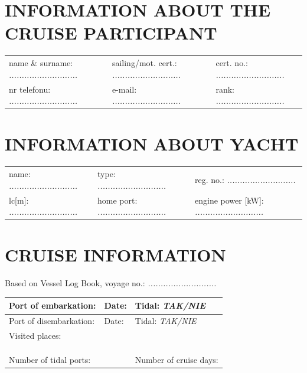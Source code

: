 \documentclass{article}
\begin{document}
\section*{INFORMATION ABOUT THE CRUISE PARTICIPANT}
\begin{tabularx}{\textwidth}{X X X}
name \& surname: \textit{...........................} & sailing/mot. cert.: \textit{...........................} & cert. no.: \textit{...........................} \\
nr telefonu: \textit{...........................} & e-mail: \textit{...........................} & rank: \textit{...........................} \\
\end{tabularx}

\section*{INFORMATION ABOUT YACHT}

\begin{tabularx}{\textwidth}{X X X}
name: \textit{...........................} & type: \textit{...........................} & reg. no.: \textit{...........................} \\
lc[m]: \textit{...........................} & home port: \textit{...........................} & engine power [kW]: \textit{...........................} \\
\end{tabularx}

\section*{CRUISE INFORMATION}

Based on Vessel Log Book, voyage no.: \textit{...........................}
\\

\begin{tabularx}{\textwidth}{|X|X|X|}
\hline
Port of embarkation: \textit{} & Date: \textit{} & Tidal: \textit{TAK/NIE} \\
\hline
Port of disembarkation: \textit{} & Date: \textit{} & Tidal: \textit{TAK/NIE} \\
\hline
\multicolumn{3}{|l|}{Visited places:
\dotfill} \\
\multicolumn{3}{|l|}{\dotfill} \\
\multicolumn{3}{|l|}{\dotfill} \\
\multicolumn{3}{|l|}{\dotfill} \\

\hline
\multicolumn{2}{|l|}{Number of tidal ports: \textit{}} & Number of cruise days: \textit{}\\
\hline
\end{tabularx}
\\\\
\end{document}
